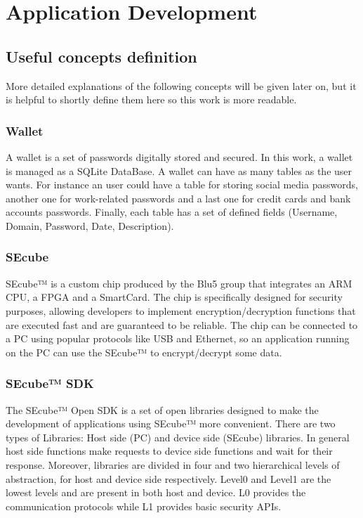 \chapter{Application Development} \label{chap:dev}


\section{Useful concepts definition}

More detailed explanations of the following concepts will be given later on, but it is helpful to shortly define them here so this work is more readable.

\subsection{Wallet} A wallet is a set of passwords digitally stored and secured. In this work, a wallet is managed as a SQLite DataBase. A wallet can have as many tables as the user wants. For instance an user could have a table for storing social media passwords, another one for work-related passwords and a last one for credit cards and bank accounts passwords. Finally, each table has a set of defined fields (Username, Domain, Password, Date, Description).

\subsection{SEcube} SEcube™ is a custom chip produced by the Blu5 group \cite{Blu5} that integrates an ARM CPU, a FPGA and a SmartCard. The chip is specifically designed for security purposes, allowing developers to implement encryption/decryption functions that are executed fast and are guaranteed to be reliable. The chip can be connected to a PC using popular protocols like USB and Ethernet, so an application running on the PC can use the SEcube™ to encrypt/decrypt some data.

\subsection{SEcube™ SDK} The SEcube™ Open SDK \cite{SEcubeRes} is a set of open libraries designed to make the development of applications using SEcube™ more convenient. There are two types of Libraries: Host side (PC) and device side (SEcube) libraries. In general host side functions make requests to device side functions and wait for their response. Moreover, libraries are divided in four and two hierarchical levels of abstraction, for host and device side respectively. Level0 and Level1 are the lowest levels and are present in both host and device. L0 provides the communication protocols while L1 provides basic security APIs.


